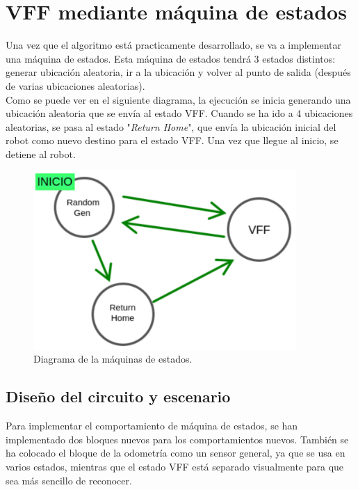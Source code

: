 \section{VFF mediante máquina de estados}
\label{sec:FSM}

Una vez que el algoritmo está practicamente desarrollado, se va a implementar una máquina de estados. Esta máquina de estados tendrá 3 estados distintos: generar ubicación
aleatoria, ir a la ubicación y volver al punto de salida (después de varias ubicaciones aleatorias).\\

Como se puede ver en el siguiente diagrama, la ejecución se inicia
generando una ubicación aleatoria que se envía al estado VFF. Cuando se ha ido a 4 ubicaciones aleatorias, se pasa al estado "\textit{Return Home}", que envía la ubicación
inicial del robot como nuevo destino para el estado VFF. Una vez que llegue al inicio, se detiene al robot.

\begin{figure} [H]
    \begin{center}
        \includegraphics[width=10cm]{figs/c6/FSM_diag.png}
    \end{center}
    \caption[Diagrama máquina de estados]{Diagrama de la máquinas de estados.}
    \label{fig:FSM_diag}
\end{figure}

\subsection{Diseño del circuito y escenario}
\label{subsec:dis_bloques_FSM}

Para implementar el comportamiento de máquina de estados, se han implementado dos bloques nuevos para los comportamientos nuevos. También se ha colocado el bloque de la odometría
como un sensor general, ya que se usa en varios estados, mientras que el estado VFF está separado visualmente para que sea más sencillo de reconocer.


